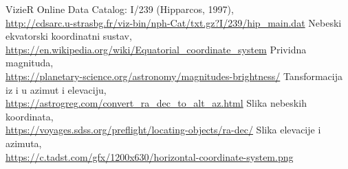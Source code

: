 \begin{thebibliography}{9}
  VizieR Online Data Catalog: I/239 (Hipparcos, 1997),\\
  \url{http://cdsarc.u-strasbg.fr/viz-bin/nph-Cat/txt.gz?I/239/hip\_main.dat}
  Nebeski ekvatorski koordinatni sustav,  \\
  \url{https://en.wikipedia.org/wiki/Equatorial_coordinate_system}
  Prividna magnituda, \\
  \url{https://planetary-science.org/astronomy/magnitudes-brightness/}
  Tansformacija iz  i  u azimut i elevaciju, \\
  \url{https://astrogreg.com/convert_ra_dec_to_alt_az.html}
  Slika nebeskih koordinata, \\
  \url{https://voyages.sdss.org/preflight/locating-objects/ra-dec/}
  Slika elevacije i azimuta, \\
  \url{https://c.tadst.com/gfx/1200x630/horizontal-coordinate-system.png}

\end{thebibliography}

